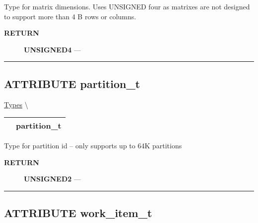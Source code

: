 \par





Type for matrix dimensions. Uses UNSIGNED four as matrixes are not designed to support more than 4 B rows or columns.








\par
\begin{description}
\item [\colorbox{tagtype}{\color{white} \textbf{\textsf{RETURN}}}] \textbf{UNSIGNED4} --- 
\end{description}




\rule{\linewidth}{0.5pt}
\subsection*{\textsf{\colorbox{headtoc}{\color{white} ATTRIBUTE}
partition\_t}}

\hypertarget{ecldoc:pbblas.types.partition_t}{}
\hspace{0pt} \hyperlink{ecldoc:PBblas.Types}{Types} \textbackslash 

{\renewcommand{\arraystretch}{1.5}
\begin{tabularx}{\textwidth}{|>{\raggedright\arraybackslash}l|X|}
\hline
\hspace{0pt}\mytexttt{\color{red} } & \textbf{partition\_t} \\
\hline
\end{tabularx}
}

\par





Type for partition id -- only supports up to 64K partitions








\par
\begin{description}
\item [\colorbox{tagtype}{\color{white} \textbf{\textsf{RETURN}}}] \textbf{UNSIGNED2} --- 
\end{description}




\rule{\linewidth}{0.5pt}
\subsection*{\textsf{\colorbox{headtoc}{\color{white} ATTRIBUTE}
work\_item\_t}}

